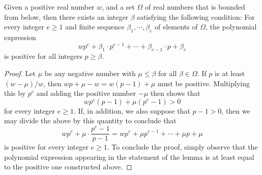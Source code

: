 \documentclass[11pt]{amsart}
\begin{document}
{%
% 
}

\newpage




\newpage


\begin{lemma}
\label{positive polynomial: L}
Given a positive real number $w$, and a set $\Omega$ of real numbers that is bounded from below, then there exists an integer $\beta$ satisfying the following condition\textup:  For every integer $e \geq 1$ and finite sequence $\beta_1, \cdots, \beta_e$ of elements of $\Omega$, the polynomial expression \[ wp^{e} + \beta_1 \cdot p^{e-1} + \cdots + \beta_{e-1} \cdot p + \beta_e  \] is positive for all integers $p \geq \beta$.
\end{lemma}


\begin{proof}
Let $\mu$ be any negative number with $\mu \leq \beta$ for all $\beta \in \Omega$.    If $p$ is at least $(w-\mu)/w$, then $wp + \mu - w = w(p-1) + \mu$ must be positive.  Multiplying this by $p^e$ and adding the positive number $-\mu$ then shows that
%
\[ wp^e ( p-1 ) + \mu (p^e-1) > 0 \] for every integer $e \geq 1$.   If, in addition, we also suppose that $p -1 > 0$, then we may divide the above by this quantity to conclude that \[ w p^e + \mu \cdot \frac{ p^e - 1}{p-1} = wp^e + \mu p^{e-1} + \cdots + \mu p + \mu \] is positive for every integer $e \geq 1$.   To conclude the proof, simply observe that the polynomial expression appearing in the statement of the lemma is at least equal to the positive one constructed above.
\end{proof}
\end{document}
